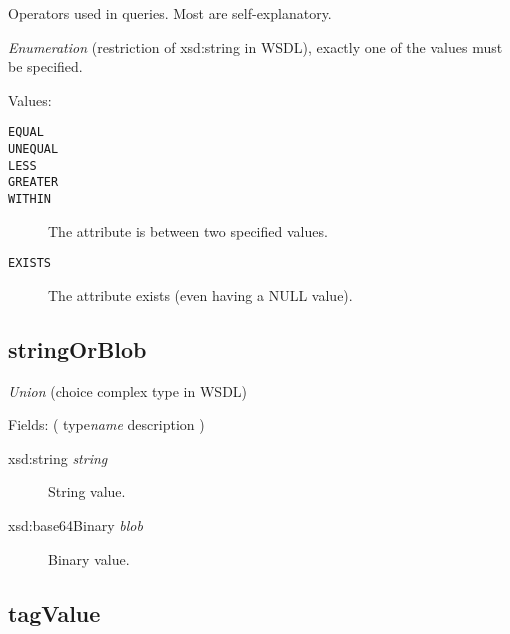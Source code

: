 Operators used in queries. Most are self-explanatory.

{\em{Enumeration}} (restriction of xsd:string in WSDL), exactly one of the values must be specified.

Values:

\begin{description}
\item[{{\frenchspacing\texttt{{EQUAL}}}}]\null{}

\item[{{\frenchspacing\texttt{{UNEQUAL}}}}]\null{}

\item[{{\frenchspacing\texttt{{LESS}}}}]\null{}

\item[{{\frenchspacing\texttt{{GREATER}}}}]\null{}

\item[{{\frenchspacing\texttt{{WITHIN}}}}]\null{}
The attribute is between two specified values.
\item[{{\frenchspacing\texttt{{EXISTS}}}}]\null{}
The attribute exists (even having a NULL value).
\end{description}
\noindent \subsection{stringOrBlob}
\label{type:stringOrBlob}\hypertarget{type:stringOrBlob}{}%



{\em{Union}} (choice complex type in WSDL)

Fields: ( type{\ttfamily\itshape{{name}}} description )

\begin{description}
\item[{xsd:string {\ttfamily\itshape{{string}}}}]\null{}
String value.
\item[{xsd:base64Binary {\ttfamily\itshape{{blob}}}}]\null{}
Binary value.
\end{description}
\noindent \subsection{tagValue}
\label{type:tagValue}\hypertarget{type:tagValue}{}%

